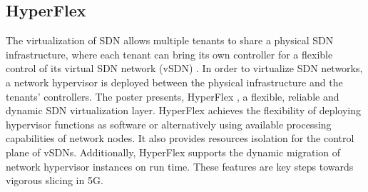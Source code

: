 
\subsection{HyperFlex}

The virtualization of \ac{SDN} allows multiple tenants to share a physical
\ac{SDN} infrastructure, where each tenant can bring its own controller for a
flexible control of its virtual \ac{SDN} network (vSDN)
\cite{ablenk:comst:2016}. In order to virtualize \ac{SDN} networks, a network
hypervisor is deployed between the physical infrastructure and the tenants'
controllers. The poster presents, HyperFlex \cite{ablenk:im:2015,
abasta:im:2015}, a flexible, reliable and dynamic SDN virtualization layer.
HyperFlex achieves the flexibility of deploying hypervisor functions as
software or alternatively using available processing capabilities of network
nodes. It also provides resources isolation for the control plane of vSDNs.
Additionally, HyperFlex supports the dynamic migration of network hypervisor
instances on run time.  These features \cite{abasta:cnsm:2015,
ablenk:tnsm:2016} are key steps towards vigorous slicing in 5G.





